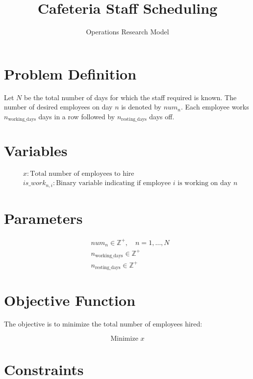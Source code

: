 \documentclass{article}
\begin{document}
\title{Cafeteria Staff Scheduling}
\author{Operations Research Model}
\date{}
\maketitle

\section*{Problem Definition}

Let \(N\) be the total number of days for which the staff required is known. The number of desired employees on day \(n\) is denoted by \(num_n\). Each employee works \(n_{\text{working\_days}}\) days in a row followed by \(n_{\text{resting\_days}}\) days off.

\section*{Variables}

\begin{align*}
& x: \text{Total number of employees to hire} \\
& is\_work_{n, i}: \text{Binary variable indicating if employee } i \text{ is working on day } n
\end{align*}

\section*{Parameters}

\begin{align*}
& num_n \in \mathbb{Z}^+, \quad n = 1, \ldots, N \\
& n_{\text{working\_days}} \in \mathbb{Z}^+ \\
& n_{\text{resting\_days}} \in \mathbb{Z}^+
\end{align*}

\section*{Objective Function}

The objective is to minimize the total number of employees hired:

\[
\text{Minimize } x
\]

\section*{Constraints}
\end{document}
